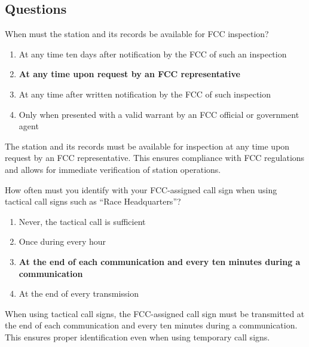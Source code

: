 \subsection*{Questions}
\begin{tcolorbox}[colback=gray!10!white,colframe=black!75!black,title={T1F01}]
    When must the station and its records be available for FCC inspection?
    \begin{enumerate}[label=\Alph*),noitemsep]
        \item At any time ten days after notification by the FCC of such an inspection
        \item \textbf{At any time upon request by an FCC representative}
        \item At any time after written notification by the FCC of such inspection
        \item Only when presented with a valid warrant by an FCC official or government agent
    \end{enumerate}
\end{tcolorbox}
The station and its records must be available for inspection at any time upon request by an FCC representative. This ensures compliance with FCC regulations and allows for immediate verification of station operations.


\begin{tcolorbox}[colback=gray!10!white,colframe=black!75!black,title={T1F02}]
    How often must you identify with your FCC-assigned call sign when using tactical call signs such as “Race Headquarters”?
    \begin{enumerate}[label=\Alph*),noitemsep]
        \item Never, the tactical call is sufficient
        \item Once during every hour
        \item \textbf{At the end of each communication and every ten minutes during a communication}
        \item At the end of every transmission
    \end{enumerate}
\end{tcolorbox}
When using tactical call signs, the FCC-assigned call sign must be transmitted at the end of each communication and every ten minutes during a communication. This ensures proper identification even when using temporary call signs.


